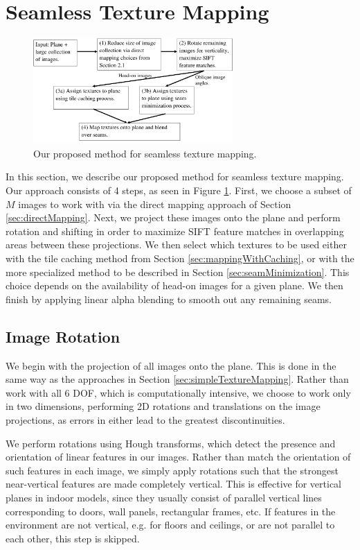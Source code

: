 \documentclass[10pt,twocolumn,letterpaper]{article}
\begin{document}
\section{Seamless Texture Mapping}
\label{sec:proposedApproach}

\begin{figure}
  \centering
  \includegraphics[width=3in]{pipeline.pdf}
  \caption{Our proposed method for seamless texture mapping.}
  \label{fig:pipeline}
\end{figure}


In this section, we describe our proposed method for seamless texture
mapping. Our approach consists of 4 steps, as seen in Figure
\ref{fig:pipeline}.  First, we choose a subset of $M$ images to work
with via the direct mapping approach of Section
\ref{sec:directMapping}. Next, we project these images onto the plane
and perform rotation and shifting in order to maximize SIFT feature
matches in overlapping areas between these projections. We then select
which textures to be used either with the tile caching method from
Section \ref{sec:mappingWithCaching}, or with the more specialized
method to be described in Section \ref{sec:seamMinimization}. This
choice depends on the availability of head-on images for a given
plane. We then finish by applying linear alpha blending to smooth out
any remaining seams.

\subsection{Image Rotation}
\label{sec:projectionAndRotation}
We begin with the projection of all images onto the plane. This is
done in the same way as the approaches in Section
\ref{sec:simpleTextureMapping}. Rather than work with all 6 DOF, which is computationally intensive, we choose to work only in two dimensions, performing 2D rotations and translations on the image projections, as errors in either lead to the greatest discontinuities.

We perform rotations using Hough transforms, which
detect the presence and orientation of linear features in our
images. Rather than match the orientation of such features in each
image, we simply apply rotations such that the strongest near-vertical
features are made completely vertical. This is effective for vertical
planes in indoor models, since they usually consist of parallel
vertical lines corresponding to doors, wall panels, rectangular
frames, etc. If features in the environment are not vertical, e.g. for
floors and ceilings, or are not parallel to each other, this step is
skipped.
\end{document}
